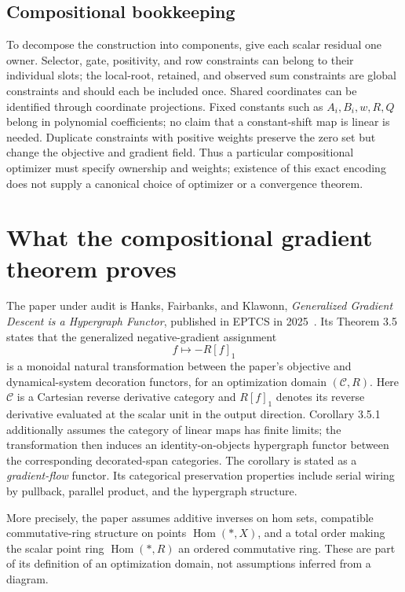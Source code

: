 \documentclass[11pt]{article}
\theoremstyle{remark}
\begin{document}
\subsection{Compositional bookkeeping}
To decompose the construction into components, give each scalar residual
one owner. Selector, gate, positivity, and row constraints can belong to
their individual slots; the local-root, retained, and observed sum
constraints are global constraints and should each be included once.
Shared coordinates can be identified through coordinate projections.
Fixed constants such as $A_i,B_i,w,R,Q$ belong in polynomial coefficients;
no claim that a constant-shift map is linear is needed. Duplicate
constraints with positive weights preserve the zero set but change the
objective and gradient field. Thus a particular compositional optimizer
must specify ownership and weights; existence of this exact encoding does
not supply a canonical choice of optimizer or a convergence theorem.

\section{What the compositional gradient theorem proves}\label{sec:composition}

The paper under audit is Hanks, Fairbanks, and Klawonn, \emph{Generalized Gradient Descent is a Hypergraph Functor}, published in EPTCS in 2025~\cite{Hanks2025}. Its Theorem 3.5 states that the generalized negative-gradient assignment
\[
 f\longmapsto -R[f]_1
\]
is a monoidal natural transformation between the paper's objective and dynamical-system decoration functors, for an optimization domain $(\mathcal C,R)$. Here $\mathcal C$ is a Cartesian reverse derivative category and $R[f]_1$ denotes its reverse derivative evaluated at the scalar unit in the output direction. Corollary 3.5.1 additionally assumes the category of linear maps has finite limits; the transformation then induces an identity-on-objects hypergraph functor between the corresponding decorated-span categories. The corollary is stated as a \emph{gradient-flow} functor. Its categorical preservation properties include serial wiring by pullback, parallel product, and the hypergraph structure.

More precisely, the paper assumes additive inverses on hom sets, compatible commutative-ring structure on points $\operatorname{Hom}(*,X)$, and a total order making the scalar point ring $\operatorname{Hom}(*,R)$ an ordered commutative ring. These are part of its definition of an optimization domain, not assumptions inferred from a diagram.
\end{document}
